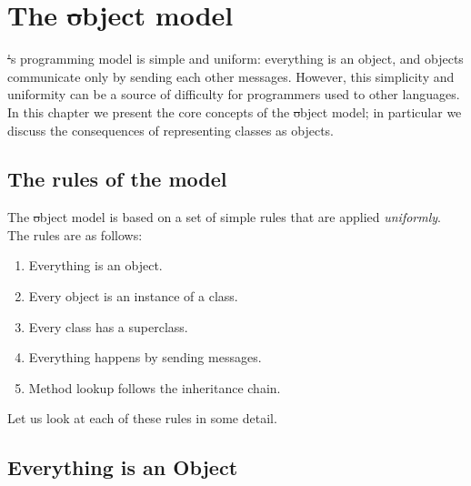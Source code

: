 \documentclass[a4paper,10pt,twoside]{book}
\begin{document}
	\renewcommand{\nnbb}[2]{} %
	\sloppy
\fi
\chapter{The \st object model}
\label{cha:model}

\st's programming model is simple and uniform: everything is an object, and objects communicate only by sending each other messages.
However, this simplicity and uniformity can be a source of difficulty for programmers used to other languages. In this chapter we present the core concepts of the \st object model; in particular we discuss the consequences of representing classes as objects.

\section{The rules of the model}
\label{sec:rules}

The \st object model is based on a set of simple 
rules that are applied \emph{uniformly}. The rules are as follows:

\begin{enumerate}[label={\textbf{Rule \arabic{*}}.}, ref={Rule \arabic{*}}, leftmargin=*]
\item{} \label{rule:everything}
	Everything is an object.

\item{} \label{rule:instance}
	Every object is an instance of a class.

\item{}  \label{rule:inheritance}
	Every class has a superclass.

\item{}  \label{rule:message}
	Everything happens by sending messages.

\item{}  \label{rule:lookup}
	Method lookup follows the inheritance chain.

\end{enumerate}

\noindent
Let us look at each of these rules in some detail.


\section{Everything is an Object}
\end{document}
